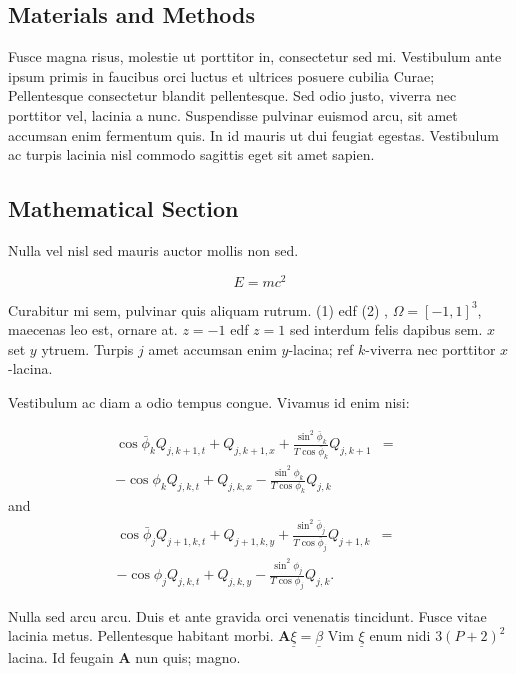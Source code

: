 \documentclass[a1,portrait]{a1poster}
\begin{document}
\begin{multicols}{2}
\section*{Materials and Methods}

Fusce magna risus, molestie ut porttitor in, consectetur sed mi. Vestibulum ante ipsum primis in faucibus orci luctus et ultrices posuere cubilia Curae; Pellentesque consectetur blandit pellentesque. Sed odio justo, viverra nec porttitor vel, lacinia a nunc. Suspendisse pulvinar euismod arcu, sit amet accumsan enim fermentum quis. In id mauris ut dui feugiat egestas. Vestibulum ac turpis lacinia nisl commodo sagittis eget sit amet sapien.


\subsection*{Mathematical Section}

Nulla vel nisl sed mauris auctor mollis non sed. 

\begin{equation}
E = mc^{2}
\label{eqn:Einstein}
\end{equation}

Curabitur mi sem, pulvinar quis aliquam rutrum. (1) edf (2)
, $\Omega=[-1,1]^3$, maecenas leo est, ornare at. $z=-1$ edf $z=1$ sed interdum felis dapibus sem. $x$ set $y$ ytruem. 
Turpis $j$ amet accumsan enim $y$-lacina; 
ref $k$-viverra nec porttitor $x$-lacina. 

Vestibulum ac diam a odio tempus congue. Vivamus id enim nisi:

\begin{eqnarray}
\cos\bar{\phi}_k Q_{j,k+1,t} + Q_{j,k+1,x}+\frac{\sin^2\bar{\phi}_k}{T\cos\bar{\phi}_k} Q_{j,k+1} &=&\nonumber\\ 
-\cos\phi_k Q_{j,k,t} + Q_{j,k,x}-\frac{\sin^2\phi_k}{T\cos\phi_k} Q_{j,k}\label{edgek}
\end{eqnarray}
and
\begin{eqnarray}
\cos\bar{\phi}_j Q_{j+1,k,t} + Q_{j+1,k,y}+\frac{\sin^2\bar{\phi}_j}{T\cos\bar{\phi}_j} Q_{j+1,k}&=&\nonumber \\
-\cos\phi_j Q_{j,k,t} + Q_{j,k,y}-\frac{\sin^2\phi_j}{T\cos\phi_j} Q_{j,k}.\label{edgej}
\end{eqnarray} 

Nulla sed arcu arcu. Duis et ante gravida orci venenatis tincidunt. Fusce vitae lacinia metus. Pellentesque habitant morbi. $\mathbf{A}\underline{\xi}=\underline{\beta}$ Vim $\underline{\xi}$ enum nidi $3(P+2)^{2}$ lacina. Id feugain $\mathbf{A}$ nun quis; magno.


\end{multicols}
\end{document}
